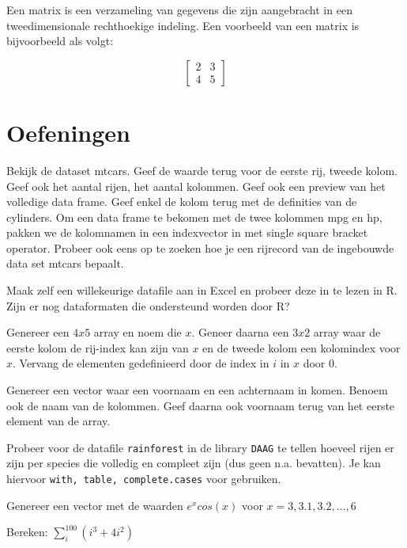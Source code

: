 Een matrix is een verzameling van gegevens die zijn aangebracht in een tweedimensionale rechthoekige indeling. Een voorbeeld van een matrix is bijvoorbeeld als volgt:

\[
\begin{bmatrix}
2 & 3 \\ 
4 & 5  
\end{bmatrix}
\]



\section{Oefeningen}

\begin{exercise}
  Bekijk de dataset mtcars. Geef de waarde terug voor de eerste rij, tweede kolom. Geef ook het aantal rijen, het aantal kolommen. Geef ook een preview van het volledige data frame. Geef enkel de kolom terug met de definities van de cylinders. Om een data frame te bekomen met de twee kolommen mpg en hp, pakken we de kolomnamen in een indexvector in met single square bracket operator. Probeer ook eens op te zoeken hoe je een rijrecord van de ingebouwde data set mtcars bepaalt.
\end{exercise}

\begin{exercise}
  Maak zelf een willekeurige datafile aan in Excel en probeer deze in te lezen in R. Zijn er nog dataformaten die ondersteund worden door R?
\end{exercise}

\begin{exercise}
  Genereer een $4x5$ array en noem die $x$. Geneer daarna een $3x2$ array waar de eerste kolom de rij-index kan zijn van $x$ en de tweede kolom een kolomindex voor $x$. Vervang de elementen gedefinieerd door de index in $i$ in $x$ door 0. 
\end{exercise}

\begin{exercise}
  Genereer een vector waar een voornaam en een achternaam in komen. Benoem ook de naam van de kolommen. Geef daarna ook voornaam terug van het eerste element van de array. 
\end{exercise}

\begin{exercise}
  Probeer voor de datafile \texttt{rainforest} in de library \texttt{DAAG} te tellen hoeveel rijen er zijn per species die volledig en compleet zijn (dus geen n.a. bevatten). Je kan hiervoor \texttt{with, table, complete.cases} voor gebruiken. 
\end{exercise}

\begin{exercise}
	Genereer een vector met de waarden $e^x cos(x)$ voor $x= 3, 3.1, 3.2, \dots ,6$
\end{exercise}

\begin{exercise}
	Bereken: $\sum_{i}^{100}(i^3 + 4i^2)$
\end{exercise}
